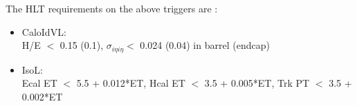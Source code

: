 The HLT requirements on the above triggers are \cite{ref:eghlt}:

\begin{itemize}
\item CaloIdVL: \\
  H/E $<$ 0.15 (0.1), $\sigma_{i\eta i\eta} <$ 0.024 (0.04) in barrel (endcap)
\item IsoL: \\
  Ecal ET $<$ 5.5 + 0.012*ET, %
  Hcal ET $<$ 3.5 + 0.005*ET, %
  Trk PT $<$ 3.5 + 0.002*ET 
\end{itemize}



